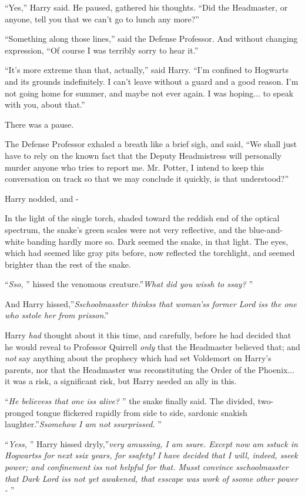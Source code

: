 ``Yes,'' Harry said. He paused, gathered his thoughts. ``Did the
Headmaster, or anyone, tell you that we can't go to lunch any more?''

``Something along those lines,'' said the Defense Professor. And without
changing expression, ``Of course I was terribly sorry to hear it.''

``It's more extreme than that, actually,'' said Harry. ``I'm confined to
Hogwarts and its grounds indefinitely. I can't leave without a guard and
a good reason. I'm not going home for summer, and maybe not ever again.
I was hoping... to speak with you, about that.''

There was a pause.

The Defense Professor exhaled a breath like a brief sigh, and said, ``We
shall just have to rely on the known fact that the Deputy Headmistress
will personally murder anyone who tries to report me. Mr. Potter, I
intend to keep this conversation on track so that we may conclude it
quickly, is that understood?''

Harry nodded, and -

In the light of the single torch, shaded toward the reddish end of the
optical spectrum, the snake's green scales were not very reflective, and
the blue-and-white banding hardly more so. Dark seemed the snake, in
that light. The eyes, which had seemed like gray pits before, now
reflected the torchlight, and seemed brighter than the rest of the
snake.

``\emph{Sso,} '' hissed the venomous creature.''\emph{What did you wissh
to ssay?} ''

And Harry hissed,''\emph{Sschoolmasster thinkss that woman'ss former
Lord iss the one who sstole her from prisson}.''

Harry \emph{had} thought about it this time, and carefully, before he
had decided that he would reveal to Professor Quirrell \emph{only} that
the Headmaster believed that; and \emph{not} say anything about the
prophecy which had set Voldemort on Harry's parents, nor that the
Headmaster was reconstituting the Order of the Phoenix... it was a
risk, a significant risk, but Harry needed an ally in this.

``\emph{He believess that one iss alive?} '' the snake finally said. The
divided, two-pronged tongue flickered rapidly from side to side,
sardonic snakish laughter.''\emph{Ssomehow I am not ssurprissed.} ''

``\emph{Yess,} '' Harry hissed dryly,''\emph{very amussing, I am ssure.
Except now am sstuck in Hogwartss for next ssix years, for ssafety! I
have decided that I will, indeed, sseek power; and confinement iss not
helpful for that. Musst convince sschoolmasster that Dark Lord iss not
yet awakened, that esscape was work of ssome other power -} ''

